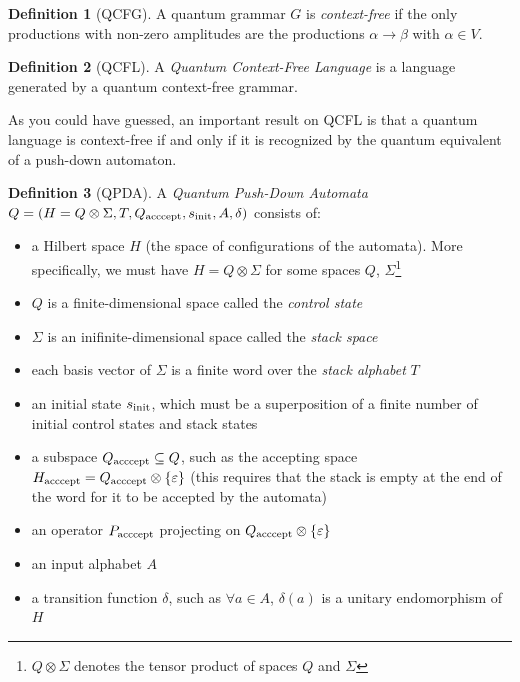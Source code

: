 \documentclass[12pt,a4paper]{article}
\theoremstyle{plain}
\theoremstyle{definition}
\newtheorem*{definition}{Definition}
\begin{document}
\begin{definition}[QCFG]
    A quantum grammar $G$ is \emph{context-free} if the only productions with non-zero amplitudes are the productions $\alpha\to\beta$ with $\alpha\in V$.
\end{definition}

\begin{definition}[QCFL]
    A \emph{Quantum Context-Free Language} is a language generated by a quantum context-free grammar.
\end{definition}

As you could have guessed, an important result on QCFL is that a quantum language is context-free if and only if it is recognized by the quantum equivalent of a push-down automaton.

\begin{definition}[QPDA]
    A \emph{Quantum Push-Down Automata} $Q=(H=Q\otimes \Sigma, T, Q_{\textnormal{acccept}}, s_{\textnormal{init}}, A, \delta)$ consists of:
    \begin{itemize}[label=--, noitemsep]
        \item a Hilbert space $H$ (the space of configurations of the automata). More specifically, we must have $H=Q\otimes \Sigma$ for some spaces $Q$, $\Sigma$\footnote{$Q\otimes \Sigma$ denotes the tensor product of spaces $Q$ and $\Sigma$}
        \item $Q$ is a finite-dimensional space called the \emph{control state}
        \item $\Sigma$ is an inifinite-dimensional space called the \emph{stack space}
        \item each basis vector of $\Sigma$ is a finite word over the \emph{stack alphabet} $T$
        \item an initial state $s_{\textnormal{init}}$, which must be a superposition of a finite number of initial control states and stack states
        \item a subspace $Q_{\textnormal{acccept}} \subseteq Q$, such as the accepting space $H_{\textnormal{acccept}}=Q_{\textnormal{acccept}}\otimes \{\varepsilon\}$ (this requires that the stack is empty at the end of the word for it to be accepted by the automata)
        \item an operator $P_{\textnormal{acccept}}$ projecting on $Q_{\textnormal{acccept}}\otimes \{\varepsilon\}$
        \item an input alphabet $A$
        \item a transition function $\delta$, such as $\forall a\in A$, $\delta(a)$ is a unitary endomorphism of $H$
    \end{itemize}


\end{definition}
\end{document}
